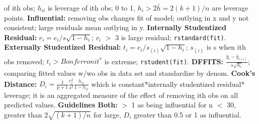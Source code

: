 \documentclass[8pt]{extarticle}
\begin{document}
of ith obs; $h_{ii}$ is leverage of ith obs; 0 to 1, $h_i > 2\bar{h} = 2(k+1)/n$
are leverage points.
\textbf{Influential:} removing obs changes fit of model; outlying in x and y not
consistent; large residuals mean outlying in y.
\textbf{Internally Studentized Residual:} $r_i = e_i / s\sqrt{1 - h_{i}}$; $r_i$
$>$ 3 is large residual; \texttt{rstandard(fit)}.
\textbf{Externally Studentized Residual:} $t_i = e_i / s_{(i)}\sqrt{1 - h_{i}}$;
$s_{(i)}$ is s when ith obs removed; $t_i > Bonferroni t^*$ is extreme; 
\texttt{rstudent(fit)}.
\textbf{DFFITS:} $\frac{\hat{y}_i - \hat{y}_{i(i)}}{s\sqrt{h_{i}}}$; comparing 
fitted values w/wo obs in data set and standardize by denom.
\textbf{Cook's Distance:} $D_i = \frac{1}{p+1}\frac{e_i^2}{s^2}
\frac{h_{ii}}{1 - h_{ii}}$ which is constant*internally studentized residual*
leverage; it is an aggregated measure of the effect of removing ith obs on all
predicted values.
\textbf{Guidelines Both:} $>$ 1 as being influential for n $<$ 30, greater than 
$2\sqrt{(k+1)/n}$ for large, $D_i$ greater than 0.5 or 1 as influential.\\
\\
\end{document}
